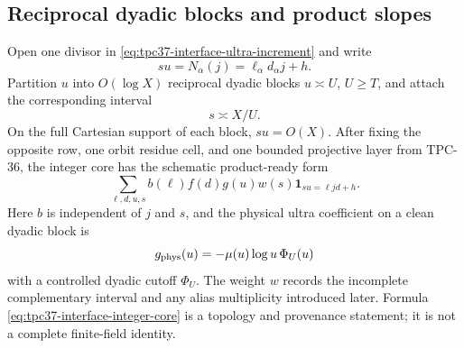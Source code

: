 \subsection{Reciprocal dyadic blocks and product slopes}

Open one divisor in \eqref{eq:tpc37-interface-ultra-increment} and write
\begin{equation}
 su=N_\alpha(j)=\ell_\alpha d_\alpha j+h.
 \label{eq:tpc37-interface-reflection}
\end{equation}
Partition $u$ into $O(\log X)$ reciprocal dyadic blocks
$u\asymp U$, $U\ge T$, and attach the corresponding interval
\begin{equation}
 s\asymp X/U.
 \label{eq:tpc37-interface-complementary-range}
\end{equation}
On the full Cartesian support of each block, $su=O(X)$.  After fixing
the opposite row, one orbit residue cell, and one bounded projective
layer from TPC-36, the integer core has the schematic product-ready form
\begin{equation}
 \sum_{\ell,d,u,s}
 b(\ell)f(d)g(u)w(s)
 \mathbf1_{su=\ell jd+h}.
 \label{eq:tpc37-interface-integer-core}
\end{equation}
Here $b$ is independent of $j$ and $s$, and the physical ultra
coefficient on a clean dyadic block is
\begin{equation}
 g_{\rm phys}(u)=-\mu(u)\log u\,\Phi_U(u)
 \label{eq:tpc37-interface-physical-ultra}
\end{equation}
with a controlled dyadic cutoff $\Phi_U$.  The weight $w$ records the
incomplete complementary interval and any alias multiplicity introduced
later.  Formula \eqref{eq:tpc37-interface-integer-core} is a topology and
provenance statement; it is not a complete finite-field identity.

